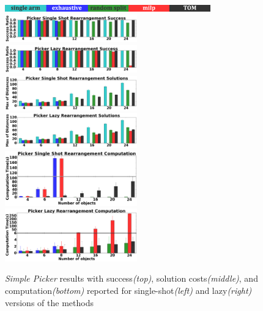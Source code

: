 \begin{figure}[h]
\vspace{-0.2in}
	\centering
	\includegraphics[width=3.5in]{figures/results/labels}
	\includegraphics[width=2.25in]{figures/results/4_sp_ms_success}
	\includegraphics[width=2.25in]{figures/results/3_sp_lazy_ms_success}
	\includegraphics[width=2.25in]{figures/results/4_sp_ms_cost}
	\includegraphics[width=2.25in]{figures/results/3_sp_lazy_ms_cost}
	\includegraphics[width=2.25in]{figures/results/4_sp_ms_time}
	\includegraphics[width=2.25in]{figures/results/3_sp_lazy_ms_time}
	\vspace{-0.15in}
	\caption{\textit{Simple Picker} results with success\textit{(top)}, solution costs\textit{(middle)}, and computation\textit{(bottom)} reported for single-shot\textit{(left)} and lazy\textit{(right)} versions of the methods}
    \vspace{-0.3in}
	\label{fig:disk}
\end{figure}

